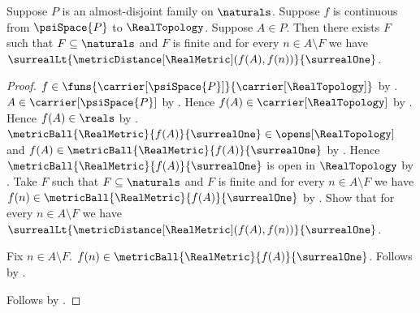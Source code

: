 \begin{lemma}\label{psi_continuous_real_map_eventually_unit_close}
    Suppose $P$ is an almost-disjoint family on $\naturals$.
    Suppose $f$ is continuous from $\psiSpace{P}$ to $\RealTopology$.
    Suppose $A\in P$.
    Then there exists $F$ such that $F\subseteq\naturals$ and
        $F$ is finite and for every $n\in A\setminus F$ we have
            $\surrealLt{\metricDistance[\RealMetric](f(A),f(n))}
                {\surrealOne}$.
\end{lemma}
\begin{proof}
    $f\in\funs{\carrier[\psiSpace{P}]}{\carrier[\RealTopology]}$
        by .
    $A\in\carrier[\psiSpace{P}]$ by
        .
    Hence $f(A)\in\carrier[\RealTopology]$ by .
    Hence $f(A)\in\reals$ by .
    $\metricBall{\RealMetric}{f(A)}{\surrealOne}
        \in\opens[\RealTopology]$ and
        $f(A)\in\metricBall{\RealMetric}{f(A)}{\surrealOne}$ by
        .
    Hence $\metricBall{\RealMetric}{f(A)}{\surrealOne}$ is open in
        $\RealTopology$ by .
    Take $F$ such that $F\subseteq\naturals$ and $F$ is finite and
        for every $n\in A\setminus F$ we have
            $f(n)\in\metricBall{\RealMetric}{f(A)}{\surrealOne}$
        by .
    Show that for every $n\in A\setminus F$ we have
        $\surrealLt{\metricDistance[\RealMetric](f(A),f(n))}
            {\surrealOne}$.
    \begin{subproof}
        Fix $n\in A\setminus F$.
        $f(n)\in\metricBall{\RealMetric}{f(A)}{\surrealOne}$.
        Follows by .
    \end{subproof}
    Follows by \auto.
\end{proof}

